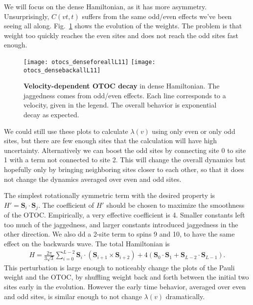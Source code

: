 We will focus on the dense Hamiltonian, as it has more asymmetry. Unsurprisingly, $C(vt,t)$ suffers from the same odd/even effects we've been seeing all along. Fig.~\ref{fig:otocs_denseforeallL11} shows the evolution of the weights. The problem is that weight too quickly reaches the even sites and does not reach the odd sites fast enough.

\begin{figure}
	\centering
	\texttt{[image: otocs\_denseforeallL11]}
	\texttt{[image: otocs\_densebackallL11]}
	\caption{\textbf{Velocity-dependent OTOC decay} in dense Hamiltonian. The jaggedness comes from odd/even effects. Each line corresponds to a velocity, given in the legend. The overall behavior is exponential decay as expected.}
	\label{fig:otocs_denseforeallL11}
\end{figure}

We could still use these plots to calculate $\lambda(v)$ using only even or only odd sites, but there are few enough sites that the calculation will have high uncertainty. Alternatively we can boost the odd sites by connecting site 0 to site 1 with a term not connected to site 2. This will change the overall dynamics but hopefully only by bringing neighboring sites closer to each other, so that it does not change the dynamics averaged over even and odd sites.

The simplest rotationally symmetric term with the desired property is $H'=\bm{S}_i\cdot\bm{S}_j$. The coefficient of $H'$ should be chosen to maximize the smoothness of the OTOC. Empirically, a very effective coefficient is 4. Smaller constants left too much of the jaggedness, and larger constants introduced jaggedness in the other direction. We also dd a 2-site term to spins 9 and 10, to have the same effect on the backwards wave. The total Hamiltonian is
\begin{align}
H = \frac{2\pi}{3\sqrt{3}}\sum_{i=0}^{L-2}\bm{S}_i \cdot \left(\bm{S}_{i+1}
	\times\bm{S}_{i+2}\right) + 4\left(\bm{S}_0\cdot\bm{S}_1 + \bm{S}_{L-2}
	\cdot\bm{S}_{L-1}\right).
\end{align}
This perturbation is large enough to noticeably change the plots of the Pauli weight and the OTOC, by shuffling weight back and forth between the initial two sites early in the evolution. However the early time behavior, averaged over even and odd sites, is similar enough to not change $\lambda(v)$ dramatically.

